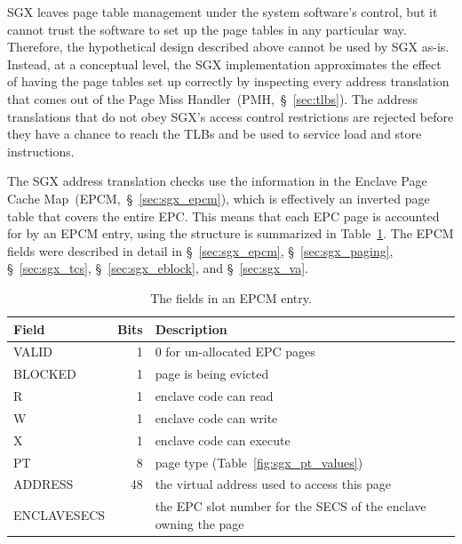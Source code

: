 SGX leaves page table management under the system software's control, but it
cannot trust the software to set up the page tables in any particular way.
Therefore, the hypothetical design described above cannot be used by SGX as-is.
Instead, at a conceptual level, the SGX implementation approximates the effect
of having the page tables set up correctly by inspecting every address
translation that comes out of the Page Miss Handler~(PMH,~\S~\ref{sec:tlbs}).
The address translations that do not obey SGX's access control restrictions
are rejected before they have a chance to reach the TLBs and be used to service
load and store instructions.


The SGX address translation checks use the information in the Enclave Page
Cache Map~(EPCM,~\S~\ref{sec:sgx_epcm}), which is effectively an inverted page
table that covers the entire EPC. This means that each EPC page is accounted
for by an EPCM entry, using the structure is summarized in
Table~\ref{fig:sgx_epcm_entry}. The EPCM fields were described in detail in
\S~\ref{sec:sgx_epcm}, \S~\ref{sec:sgx_paging}, \S~\ref{sec:sgx_tcs},
\S~\ref{sec:sgx_eblock}, and \S~\ref{sec:sgx_va}.

\begin{table}[hbt]
  \centering
  \begin{tabularx}{\columnwidth}{| l | r | X |}
  \hline
  \textbf{Field} & \textbf{Bits} & \textbf{Description}\\
  \hline
  VALID & 1 & 0 for un-allocated EPC pages \\
  \hline
  BLOCKED & 1 & page is being evicted \\
  \hline
  R & 1 & enclave code can read \\
  \hline
  W & 1 & enclave code can write \\
  \hline
  X & 1 & enclave code can execute \\
  \hline
  PT & 8 & page type (Table~\ref{fig:sgx_pt_values}) \\
  \hline
  ADDRESS & 48 & the virtual address used to access this page \\
  \hline
  ENCLAVESECS &  & the EPC slot number for the SECS of the enclave owning the
                     page \\
  \hline
  \end{tabularx}
  \caption{
    The fields in an EPCM entry.
  }
  \label{fig:sgx_epcm_entry}
\end{table}

